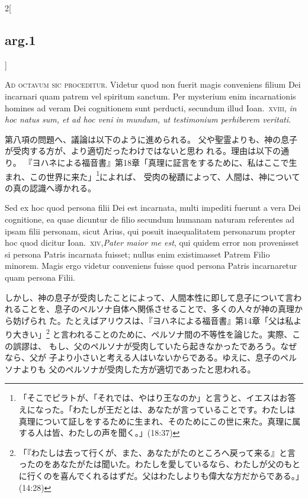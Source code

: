 \documentclass[paper=a4paper,fontsize=10pt,jafontsize=9pt,titlepage]{jlreq}
\begin{document}
\begin{paracol}{2}[\subsection{arg.1}]

{\Huge A}{\scshape d octavum sic proceditur}. Videtur quod non fuerit magis conveniens
filium Dei incarnari quam patrem vel spiritum sanctum. Per mysterium
enim incarnationis homines ad veram Dei cognitionem sunt perducti,
secundum illud Ioan.~{\scshape xviii}, {\itshape in hoc natus sum, et ad hoc veni in mundum,
ut testimonium perhiberem veritati}.

\switchcolumn

第八項の問題へ、議論は以下のように進められる。
父や聖霊よりも、神の息子が受肉する方が、より適切だったわけではないと思わ
 れる。理由は以下の通り。
『ヨハネによる福音書』第18章「真理に証言をするために、私はここで生
 まれ、この世界に来た」\footnote{「そこでピラトが、「それでは、やはり王なのか」と言うと、イエスはお答えになった。「わたしが王だとは、あなたが言っていることです。わたしは真理について証しをするために生まれ、そのためにこの世に来た。真理に属する人は皆、わたしの声を聞く。」(18:37)}によれば、
受肉の秘蹟によって、人間は、神についての真の認識へ導かれる。

\switchcolumn*

Sed ex hoc quod persona filii Dei
est incarnata, multi impediti fuerunt a vera Dei cognitione, ea quae
dicuntur de filio secundum humanam naturam referentes ad ipsam filii
personam, sicut Arius, qui posuit inaequalitatem personarum propter hoc
quod dicitur Ioan.~{\scshape xiv},{\itshape  Pater maior me est}, qui quidem error non
provenisset si persona Patris incarnata fuisset; nullus enim
existimasset Patrem Filio minorem. Magis ergo videtur conveniens fuisse
quod persona Patris incarnaretur quam persona Filii.

\switchcolumn

しかし、神の息子が受肉したことによって、人間本性に即して息子について言わ
 れることを、息子のペルソナ自体へ関係させることで、多くの人々が神の真理から妨げられ
 た。たとえばアリウスは、『ヨハネによる福音書』第14章「父は私より大きい」\footnote{「『わたしは去って行くが、また、あなたがたのところへ戻って来る』と言ったのをあなたがたは聞いた。わたしを愛しているなら、わたしが父のもとに行くのを喜んでくれるはずだ。父はわたしよりも偉大な方だからである。」(14:28)}
 と言われることのために、ペルソナ間の不等性を論じた。実際、この誤謬は、
 もし、父のペルソナが受肉していたら起きなかったであろう。なぜなら、父が
 子より小さいと考える人はいないからである。ゆえに、息子のペルソナよりも
 父のペルソナが受肉した方が適切であったと思われる。


\end{paracol}
\end{document}
